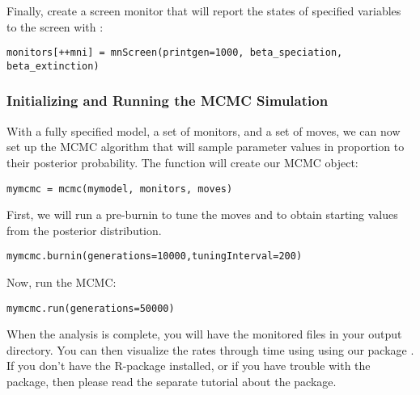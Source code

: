 Finally, create a screen monitor that will report the states of specified variables to the screen with :
{\tt \begin{snugshade*}
\begin{lstlisting}
monitors[++mni] = mnScreen(printgen=1000, beta_speciation, beta_extinction)
\end{lstlisting}
\end{snugshade*}}

\subsubsection{Initializing and Running the MCMC Simulation}

With a fully specified model, a set of monitors, and a set of moves, we can now set up the MCMC algorithm that will sample parameter values in proportion to their posterior probability. The  function will create our MCMC object:
{\tt \begin{snugshade*}
\begin{lstlisting}
mymcmc = mcmc(mymodel, monitors, moves)
\end{lstlisting}
\end{snugshade*}}

First, we will run a pre-burnin to tune the moves and to obtain starting values from the posterior distribution.
{\tt \begin{snugshade*}
\begin{lstlisting}
mymcmc.burnin(generations=10000,tuningInterval=200)
\end{lstlisting}
\end{snugshade*}}


Now, run the MCMC:
{\tt \begin{snugshade*}
\begin{lstlisting}
mymcmc.run(generations=50000)
\end{lstlisting}
\end{snugshade*}}

When the analysis is complete, you will have the monitored files in your output directory.
You can then visualize the rates through time using \R using our package \RevGadgets.
If you don't have the R-package \RevGadgets installed, or if you have trouble with the package, then please read the separate tutorial about the package.

